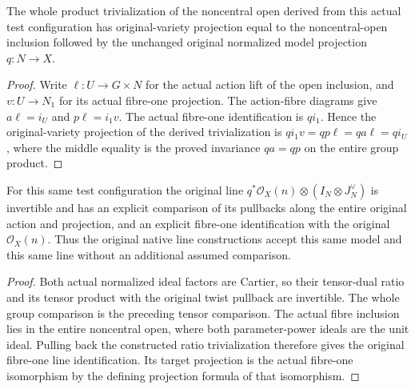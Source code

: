 \begin{theorem}
\label{thm:pl-original-normalized-native-test-configuration-original-projection}
\leanok
{}
The whole product trivialization of the noncentral open derived from this
actual test configuration has original-variety projection equal to the
noncentral-open inclusion followed by the unchanged original normalized
model projection $q:N\to X$.
\end{theorem}
\begin{proof}
Write $\ell:U\to G\times N$ for the actual action lift of the open inclusion,
and $v:U\to N_1$ for its actual fibre-one projection. The action-fibre
diagrams give $a\ell=i_U$ and $p\ell=i_1v$. The actual fibre-one
identification is $qi_1$. Hence the original-variety projection of the
derived trivialization is $qi_1v=qp\ell=qa\ell=qi_U$, where the middle
equality is the proved invariance $qa=qp$ on the entire group product.
\end{proof}

\begin{corollary}
\label{cor:pl-original-normalized-native-test-configuration-line-inputs}
\leanok
{}
For this same test configuration the original line
$q^*\mathcal O_X(n)\otimes(I_N\otimes J_N^\vee)$ is invertible and has an
explicit comparison of its pullbacks along the entire original action and
projection, and an explicit fibre-one identification with the original
$\mathcal O_X(n)$. Thus the original native line constructions accept this
same model and this same line without an additional assumed comparison.
\end{corollary}
\begin{proof}
Both actual normalized ideal factors are Cartier, so their tensor-dual
ratio and its tensor product with the original twist pullback are
invertible. The whole group comparison is the preceding tensor comparison.
The actual fibre inclusion lies in the entire noncentral open, where
both parameter-power ideals are the unit ideal. Pulling back the constructed
ratio trivialization therefore gives the original fibre-one line
identification. Its target projection is the actual fibre-one isomorphism
by the defining projection formula of that isomorphism.
\end{proof}
